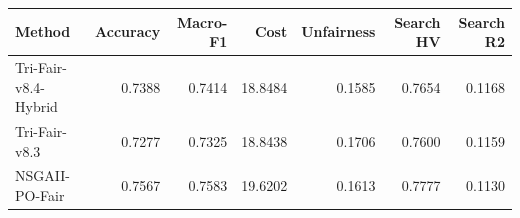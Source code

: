\begin{tabular}{lrrrrrr}
\hline
Method & Accuracy & Macro-F1 & Cost & Unfairness & Search HV & Search R2 \\
\hline
Tri-Fair-v8.4-Hybrid & 0.7388 & 0.7414 & 18.8484 & 0.1585 & 0.7654 & 0.1168 \\
Tri-Fair-v8.3 & 0.7277 & 0.7325 & 18.8438 & 0.1706 & 0.7600 & 0.1159 \\
NSGAII-PO-Fair & 0.7567 & 0.7583 & 19.6202 & 0.1613 & 0.7777 & 0.1130 \\
\hline
\end{tabular}